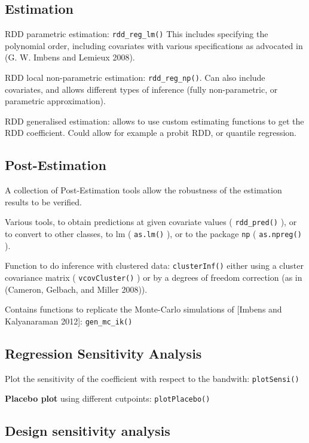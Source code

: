 \documentclass[article]{jss}
\begin{document}
\subsection{Estimation}\label{estimation}

RDD parametric estimation: \texttt{rdd\_reg\_lm()} This includes
specifying the polynomial order, including covariates with various
specifications as advocated in (G. W. Imbens and Lemieux 2008).

RDD local non-parametric estimation: \texttt{rdd\_reg\_np()}. Can also
include covariates, and allows different types of inference (fully
non-parametric, or parametric approximation).

RDD generalised estimation: allows to use custom estimating functions to
get the RDD coefficient. Could allow for example a probit RDD, or
quantile regression.

\subsection{Post-Estimation}\label{post-estimation}

A collection of Post-Estimation tools allow the robustness of the
estimation results to be verified.

Various tools, to obtain predictions at given covariate values (
\texttt{rdd\_pred()} ), or to convert to other classes, to lm (
\texttt{as.lm()} ), or to the package \texttt{np} ( \texttt{as.npreg()}
).

Function to do inference with clustered data: \texttt{clusterInf()}
either using a cluster covariance matrix ( \texttt{vcovCluster()} ) or
by a degrees of freedom correction (as in (Cameron, Gelbach, and Miller
2008)).

Contains functions to replicate the Monte-Carlo simulations of {[}Imbens
and Kalyanaraman 2012{]}: \texttt{gen\_mc\_ik()}

\subsection{Regression Sensitivity
Analysis}\label{regression-sensitivity-analysis}

Plot the sensitivity of the coefficient with respect to the bandwith:
\texttt{plotSensi()}

\textbf{Placebo plot} using different cutpoints: \texttt{plotPlacebo()}

\subsection{Design sensitivity
analysis}\label{design-sensitivity-analysis}
\end{document}
